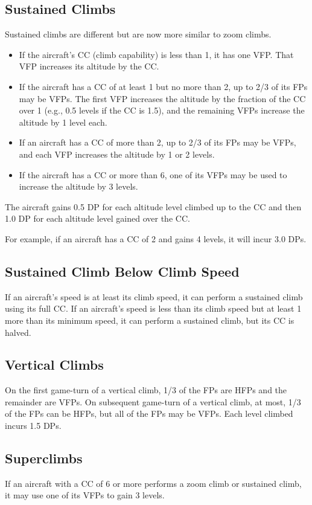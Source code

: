 \documentclass[10pt]{extarticle}
\begin{document}
\subsection{Sustained Climbs} Sustained climbs are different but are now more similar to zoom climbs. 
\begin{itemize}
    \item If the aircraft's CC (climb capability) is less than 1, it has one VFP. That VFP increases its altitude by the CC. 
    \item If the aircraft has a CC of at least 1 but no more than 2, up to 2/3 of its FPs may be VFPs. The first VFP increases the altitude by the fraction of the CC over 1 (e.g., 0.5 levels if the CC is 1.5), and the remaining VFPs increase the altitude by 1 level each. 
    \item If an aircraft has a CC of more than 2, up to 2/3 of its FPs may be VFPs, and each VFP increases the altitude by 1 or 2 levels.
    \item If the aircraft has a CC or more than 6, one of its VFPs may be used to increase the altitude by 3 levels.
\end{itemize}
The aircraft gains 0.5 DP for each altitude level climbed up to the CC and then 1.0 DP for each altitude level gained over the CC.

For example, if an aircraft has a CC of 2 and gains 4 levels, it will incur 3.0 DPs.

\subsection{Sustained Climb Below Climb Speed} If an aircraft's speed is at least its climb speed, it can perform a sustained climb using its full CC. If an aircraft's speed is less than its climb speed but at least 1 more than its minimum speed, it can perform a sustained climb, but its CC is halved.

\subsection{Vertical Climbs} On the first game-turn of a vertical climb, 1/3 of the FPs are HFPs and the remainder are VFPs. On subsequent game-turn of a vertical climb, at most, 1/3 of the FPs can be HFPs, but all of the FPs may be VFPs. Each level climbed incurs 1.5 DPs.

\subsection{Superclimbs} If an aircraft with a CC of 6 or more performs a zoom climb or sustained climb, it may use one of its VFPs to gain 3 levels.
\end{document}
